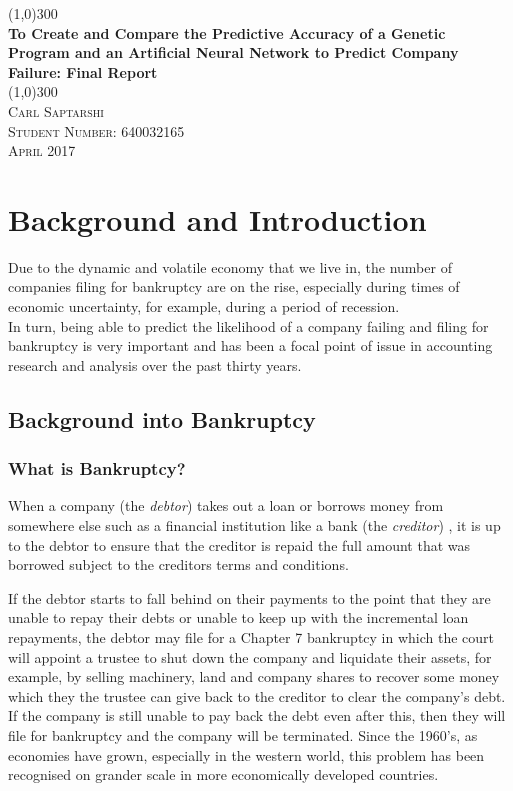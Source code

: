 \documentclass[11pt]{article}
\begin{document}
	\begin{titlepage}
		\begin{center}
			\line(1,0){300}\\
			[0.25in]
			\huge{\bfseries To Create and Compare the Predictive Accuracy of a Genetic Program and an Artificial Neural Network to Predict Company Failure: Final Report}\\
			\line(1,0){300}\\
			[1.5cm]
			
			 \textsc{Carl Saptarshi}\\
			 \textsc{\large  Student Number: 640032165 \\
			 April 2017}
			 
		\end{center}
	\end{titlepage}

\tableofcontents
\thispagestyle{empty}

\cleardoublepage
\setcounter{page}{1}
\section{Background and Introduction }\label{sec:intro}
Due to the dynamic and volatile economy that we live in, the number of companies filing for bankruptcy are on the rise, especially during times of economic uncertainty, for example, during a period of recession.\\
In turn, being able to predict the likelihood of a company failing and filing for bankruptcy is very important and has been a focal point of issue in accounting research and analysis over the past thirty years. 

\subsection{Background into Bankruptcy}
\subsubsection{What is Bankruptcy? }\label{sec:bankdef}
When a company (the \textit{debtor}) takes out a loan or borrows money from somewhere else such as a financial institution like a bank (the \textit{creditor}) , it is up to the debtor to ensure that the creditor is repaid the full amount that was borrowed subject to the creditors terms and conditions.


If the debtor starts to fall behind on their payments to the point that they are unable to repay their debts or unable to keep up with the incremental loan repayments, the debtor may file for a Chapter 7 bankruptcy in which the court will appoint a trustee to shut down the company and liquidate their assets, for example, by selling machinery, land and company shares to recover some money which they the trustee can give back to the creditor to clear the company's debt. If the company is still unable to pay back the debt even after this, then they will file for bankruptcy and the company will be terminated. Since the 1960's, as economies have grown, especially in the western world, this problem has been recognised on grander scale in more economically developed countries.
\end{document}
